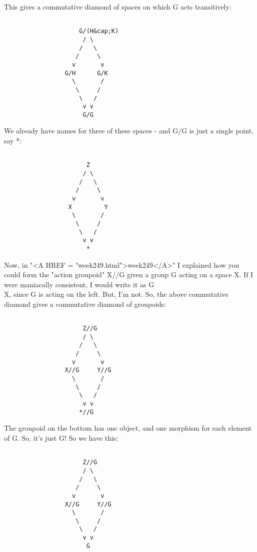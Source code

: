 This gives a commutative diamond of spaces on which G acts 
transitively:


\begin{verbatim}

                     G/(H&cap;K)
                      / \
                     /   \
                    /     \
                   v       v
                 G/H      G/K
                   \       /
                    \     /
                     \   /
                      v v
                      G/G
\end{verbatim}
    
We already have names for three of these spaces - and G/G is just
a single point, say *:


\begin{verbatim}

                       Z
                      / \
                     /   \
                    /     \
                   v       v
                  X         Y
                   \       /
                    \     /
                     \   /
                      v v
                       *
\end{verbatim}
    
Now, in "<A HREF = "week249.html">week249</A>" I explained how you could form the "action groupoid"
X//G given a group G acting on a space X.  If I were maniacally 
consistent, I would write it as G\\X, since G is acting on the left.  
But, I'm not.  So, the above commutative diamond gives a commutative 
diamond of groupoids:


\begin{verbatim}

                      Z//G
                      / \
                     /   \
                    /     \
                   v       v
                 X//G     Y//G
                   \       /
                    \     /
                     \   /
                      v v
                     *//G
\end{verbatim}
    
The groupoid on the bottom has one object, and one morphism for each
element of G.  So, it's just G!  So we have this:


\begin{verbatim}

                      Z//G
                      / \
                     /   \
                    /     \
                   v       v
                 X//G     Y//G
                   \       /
                    \     /
                     \   /
                      v v
                       G
\end{verbatim}
    
